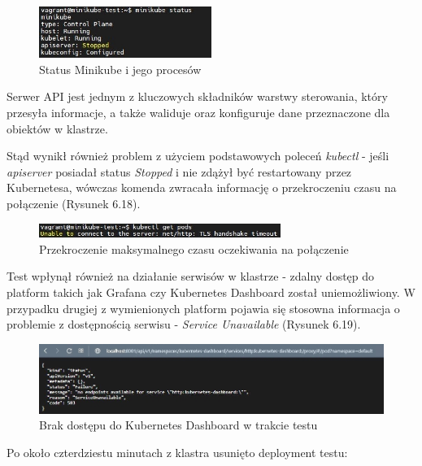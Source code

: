\begin{figure}[H]
    \centering
    \includegraphics[width=0.5\textwidth]{img/test_two/minikube-status.jpg}
    \caption{Status Minikube i jego procesów}
\end{figure}

Serwer API jest jednym z kluczowych składników warstwy sterowania, który przesyła informacje, a także waliduje oraz konfiguruje dane przeznaczone dla obiektów w klastrze.

Stąd wynikł również problem z użyciem podstawowych poleceń \textit{kubectl} - jeśli \textit{apiserver} posiadał status \textit{Stopped} i nie zdążył być restartowany przez Kubernetesa, wówczas komenda zwracała informację o przekroczeniu czasu na połączenie (Rysunek 6.18).

\begin{figure}[H]
    \centering
    \includegraphics[width=0.7\textwidth]{img/test_two/kubectl-pods.jpg}
    \caption{Przekroczenie maksymalnego czasu oczekiwania na połączenie}
\end{figure}

Test wpłynął również na działanie serwisów w klastrze - zdalny dostęp do platform takich jak Grafana czy Kubernetes Dashboard został uniemożliwiony. W przypadku drugiej z wymienionych platform pojawia się stosowna informacja o problemie z dostępnością serwisu - \textit{Service Unavailable} (Rysunek 6.19).  

\begin{figure}[H]
    \centering
    \includegraphics[width=1\textwidth]{img/test_two/dash.jpg}
    \caption{Brak dostępu do Kubernetes Dashboard w trakcie testu}
\end{figure}

Po około czterdziestu minutach z klastra usunięto deployment testu:


